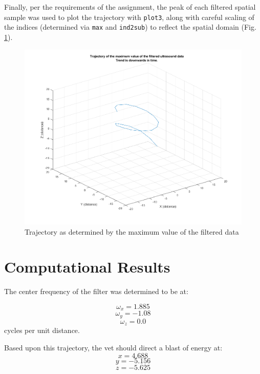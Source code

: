 \documentclass[journal]{IEEEtran}
\def\code#1{\texttt{#1}}
\begin{document}
Finally, per the requirements of the assignment, the peak of each filtered spatial sample was used to plot the trajectory with \code{plot3}, along with careful scaling of the indices (determined via \code{max} and \code{ind2sub}) to reflect the spatial domain (Fig. \ref{traj_max}).

\begin{figure}
	\centerline{\includegraphics[width=\columnwidth]{trajectory_max_plot3.png}}
	\caption{Trajectory as determined by the maximum value of the filtered data}\label{traj_max} 
\end{figure}

\section{Computational Results}

The center frequency of the filter was determined to be at:

\begin{equation}
\omega_x=1.885
\end{equation}
\begin{equation}
\omega_y=-1.08
\end{equation}
\begin{equation}
\omega_z=0.0
\end{equation}
\noindent cycles per unit distance.

Based upon this trajectory, the vet should direct a blast of energy at:
\begin{equation}
x=4.688
\end{equation}
\begin{equation}
y=-5.156
\end{equation}
\begin{equation}
z=-5.625
\end{equation}
\end{document}
